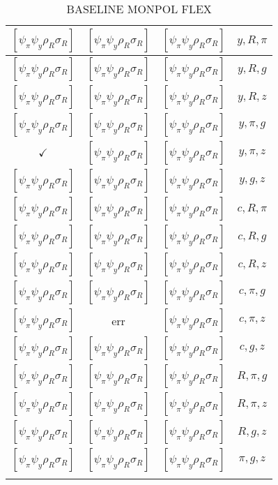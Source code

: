 \documentclass[a4paper,10pt]{article}
\begin{document}
\begin{longtable}{|c|c|c|c|}
\hline
$[\psi_\pi \psi_y \rho_R \sigma_R ]$ & $[\psi_\pi \psi_y \rho_R \sigma_R ]$ & $[\psi_\pi \psi_y \rho_R \sigma_R ]$ & ${y},{R},{\pi}$ \\
\hline
$[\psi_\pi \psi_y \rho_R \sigma_R ]$ & $[\psi_\pi \psi_y \rho_R \sigma_R ]$ & $[\psi_\pi \psi_y \rho_R \sigma_R ]$ & ${y},{R},{g}$ \\
\hline
$[\psi_\pi \psi_y \rho_R \sigma_R ]$ & $[\psi_\pi \psi_y \rho_R \sigma_R ]$ & $[\psi_\pi \psi_y \rho_R \sigma_R ]$ & ${y},{R},{z}$ \\
\hline
$[\psi_\pi \psi_y \rho_R \sigma_R ]$ & $[\psi_\pi \psi_y \rho_R \sigma_R ]$ & $[\psi_\pi \psi_y \rho_R \sigma_R ]$ & ${y},{\pi},{g}$ \\
\hline
$\checkmark$ & $[\psi_\pi \psi_y \rho_R \sigma_R ]$ & $[\psi_\pi \psi_y \rho_R \sigma_R ]$ & ${y},{\pi},{z}$ \\
\hline
$[\psi_\pi \psi_y \rho_R \sigma_R ]$ & $[\psi_\pi \psi_y \rho_R \sigma_R ]$ & $[\psi_\pi \psi_y \rho_R \sigma_R ]$ & ${y},{g},{z}$ \\
\hline
$[\psi_\pi \psi_y \rho_R \sigma_R ]$ & $[\psi_\pi \psi_y \rho_R \sigma_R ]$ & $[\psi_\pi \psi_y \rho_R \sigma_R ]$ & ${c},{R},{\pi}$ \\
\hline
$[\psi_\pi \psi_y \rho_R \sigma_R ]$ & $[\psi_\pi \psi_y \rho_R \sigma_R ]$ & $[\psi_\pi \psi_y \rho_R \sigma_R ]$ & ${c},{R},{g}$ \\
\hline
$[\psi_\pi \psi_y \rho_R \sigma_R ]$ & $[\psi_\pi \psi_y \rho_R \sigma_R ]$ & $[\psi_\pi \psi_y \rho_R \sigma_R ]$ & ${c},{R},{z}$ \\
\hline
$[\psi_\pi \psi_y \rho_R \sigma_R ]$ & $[\psi_\pi \psi_y \rho_R \sigma_R ]$ & $[\psi_\pi \psi_y \rho_R \sigma_R ]$ & ${c},{\pi},{g}$ \\
\hline
$[\psi_\pi \psi_y \rho_R \sigma_R ]$ & err & $[\psi_\pi \psi_y \rho_R \sigma_R ]$ & ${c},{\pi},{z}$ \\
\hline
$[\psi_\pi \psi_y \rho_R \sigma_R ]$ & $[\psi_\pi \psi_y \rho_R \sigma_R ]$ & $[\psi_\pi \psi_y \rho_R \sigma_R ]$ & ${c},{g},{z}$ \\
\hline
$[\psi_\pi \psi_y \rho_R \sigma_R ]$ & $[\psi_\pi \psi_y \rho_R \sigma_R ]$ & $[\psi_\pi \psi_y \rho_R \sigma_R ]$ & ${R},{\pi},{g}$ \\
\hline
$[\psi_\pi \psi_y \rho_R \sigma_R ]$ & $[\psi_\pi \psi_y \rho_R \sigma_R ]$ & $[\psi_\pi \psi_y \rho_R \sigma_R ]$ & ${R},{\pi},{z}$ \\
\hline
$[\psi_\pi \psi_y \rho_R \sigma_R ]$ & $[\psi_\pi \psi_y \rho_R \sigma_R ]$ & $[\psi_\pi \psi_y \rho_R \sigma_R ]$ & ${R},{g},{z}$ \\
\hline
$[\psi_\pi \psi_y \rho_R \sigma_R ]$ & $[\psi_\pi \psi_y \rho_R \sigma_R ]$ & $[\psi_\pi \psi_y \rho_R \sigma_R ]$ & ${\pi},{g},{z}$ \\
\hline
\caption{BASELINE MONPOL FLEX}
\label{table:MyTableLabel}
\end{longtable}
\end{document}
